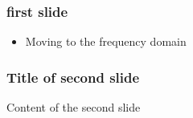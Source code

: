 
\begin{frame}
\frametitle{first slide}
\begin{itemize}
	\item Moving to the frequency domain
\end{itemize}
\end{frame}

\begin{frame}
\frametitle{Title of second slide}
Content of the second slide
\end{frame}
